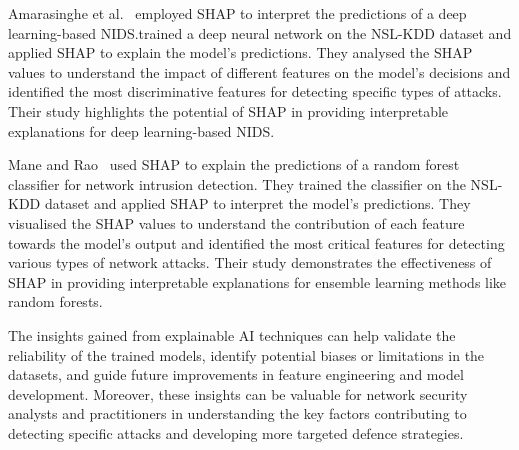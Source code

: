 Amarasinghe et al.~\cite{amarasinghe2018toward} employed SHAP to interpret the predictions of a deep learning-based NIDS.\@They trained a deep neural network on the NSL-KDD dataset and applied SHAP to explain the model's predictions. They analysed the SHAP values to understand the impact of different features on the model's decisions and identified the most discriminative features for detecting specific types of attacks. Their study highlights the potential of SHAP in providing interpretable explanations for deep learning-based NIDS.\@

Mane and Rao~\cite{mane2021explaining} used SHAP to explain the predictions of a random forest classifier for network intrusion detection. They trained the classifier on the NSL-KDD dataset and applied SHAP to interpret the model's predictions. They visualised the SHAP values to understand the contribution of each feature towards the model's output and identified the most critical features for detecting various types of network attacks. Their study demonstrates the effectiveness of SHAP in providing interpretable explanations for ensemble learning methods like random forests.

The insights gained from explainable AI techniques can help validate the reliability of the trained models, identify potential biases or limitations in the datasets, and guide future improvements in feature engineering and model development. Moreover, these insights can be valuable for network security analysts and practitioners in understanding the key factors contributing to detecting specific attacks and developing more targeted defence strategies.